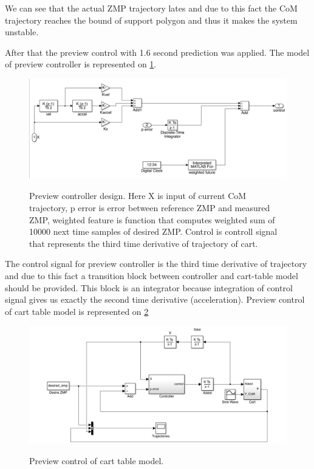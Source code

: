 \documentclass[12pt,a4paper]{report}
\begin{document}
		We can see that the actual ZMP trajectory lates and due to this fact the CoM trajectory reaches the bound of support polygon and thus it makes the system unstable.
		
		After that the preview control with 1.6 second prediction was applied. The model of preview controller  is represented on \cref{fig:18}.
		
		\begin{figure}[H]
			\vspace{-0.2cm}
			\centering
			{\includegraphics[width=1\textwidth]{18}}
			\caption{Preview controller design. Here X is input of current CoM trajectory, p error is error between reference ZMP and measured ZMP, weighted feature is function that computes weighted sum of 10000 next time samples of desired ZMP. Control is controll signal that represents the third time derivative of trajectory of cart.}
			\label{fig:18}
			\vspace{-0.1cm}
		\end{figure}
		
		The control signal for preview controller is the third time derivative of trajectory and due to this fact a transition block between controller and cart-table model should be provided. This block is an integrator because integration of control signal gives us exactly the second time derivative (acceleration). Preview control of cart table model is represented on \cref{fig:20}
		
		\begin{figure}[H]
			\vspace{-0.2cm}
			\centering
			{\includegraphics[width=1\textwidth]{20}}
			\caption{Preview control of cart table model.}
			\label{fig:20}
			\vspace{-0.1cm}
		\end{figure}
		
\end{document}
